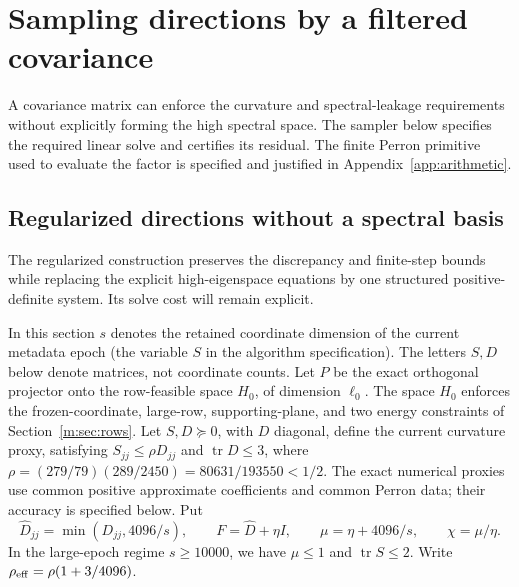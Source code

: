 \documentclass[11pt]{amsart}
\theoremstyle{definition}\newtheorem{definition}[theorem]{Definition}
\theoremstyle{remark}\newtheorem{remark}[theorem]{Remark}
\numberwithin{equation}{section}
\newcommand{\tr}{\operatorname{tr}}
\begin{document}
\section{Sampling directions by a filtered covariance}\label{sec:sampling}
A covariance matrix can enforce the curvature and spectral-leakage
requirements without explicitly forming the high spectral space.
The sampler below specifies the required linear solve and certifies
its residual.
The finite Perron primitive used to evaluate the factor is specified
and justified in Appendix~\ref{app:arithmetic}.

\subsection{Regularized directions without a spectral basis}\label{r:regularized}
The regularized construction preserves the discrepancy and finite-step bounds
while replacing the explicit high-eigenspace equations by one structured
positive-definite system. Its solve cost will remain explicit.

In this section $s$ denotes the retained coordinate dimension of the
current metadata epoch (the variable $S$ in the algorithm specification).
The letters $S,D$ below denote matrices, not coordinate counts.
Let $P$ be the exact orthogonal projector onto the row-feasible space $H_0$,
of dimension $\ell_0$. The space $H_0$ enforces the frozen-coordinate, large-row, supporting-plane,
and two energy constraints of Section~\ref{m:sec:rows}. Let
$S,D\succeq0$, with $D$ diagonal, define the current curvature proxy, satisfying
$S_{jj}\le\rho D_{jj}$ and $\tr D\le3$, where
$\rho=(279/79)(289/2450)=80631/193550<1/2$.
The exact numerical proxies use common positive approximate coefficients
and common Perron data; their accuracy is specified below. Put
\[
 \widehat D_{jj}=\min(D_{jj},4096/s),\qquad
 F=\widehat D+\eta I,\qquad \mu=\eta+4096/s,
 \qquad \chi=\mu/\eta.
\]
In the large-epoch regime $s\ge10000$, we have $\mu\le1$ and
$\tr S\le2$. Write $\rho_{\rm eff}=\rho(1+3/4096)$.
\end{document}
